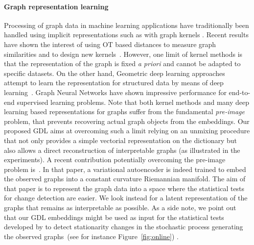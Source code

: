 \documentclass{article}
\begin{document}
	
	\paragraph{Graph representation learning} Processing of graph data
	in machine learning applications have traditionally been handled using implicit
	representations such as with graph kernels \citep{shervashidze09,vishwanathan2010graph}. Recent results have shown the
	interest of using OT based distances to measure graph similarities and to design new
	kernels~\citep{vayer-optimal-nodate,maretic2019got,chowdhury-generalized-2020}. However, one limit of kernel methods is
	that the representation of the graph is fixed \emph{a priori} and cannot be
	adapted to specific datasets. On the other hand, Geometric deep learning approaches \citep{bronstein2017geometric} attempt to learn
	the representation for structured data by means of deep learning~\citep{scarselli2008graph, perozzi2014deepwalk, niepert-learning-2016}. Graph Neural Networks \cite{wu2020comprehensive} have
	shown impressive performance for end-to-end supervised learning problems. Note
	that both kernel methods and many deep learning based representations for graphs suffer from the fundamental \emph{pre-image} problem, that prevents recovering actual
	graph objects from the embeddings. 
	Our proposed GDL aims at overcoming such a limit relying on an unmixing
	procedure that not only provides a simple vectorial representation on the
	dictionary but also allows a direct reconstruction of interpretable graphs (as
	illustrated in the experiments). A recent contribution potentially overcoming
	the pre-image problem  is~\citet{Grattarola}. In that paper, a variational
	autoencoder is indeed trained to embed the observed graphs into a constant
	curvature Riemannian manifold. The aim of that paper is to represent the graph
	data into a space where the statistical tests for change detection are easier.
	We look instead for a latent representation of the graphs that remains as
	interpretable as possible. As a side note, we point out that our GDL embeddings
	might be used as input for the statistical tests developed by
	\citep{Zambon,Zambon2019ChangePointMO} to detect stationarity changes in the
	stochastic process generating the observed graphs~(see for instance
	Figure~\ref{fig:online}) .
\end{document}
